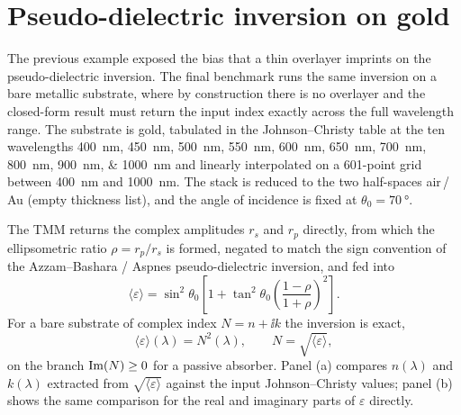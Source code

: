\section{Pseudo-dielectric inversion on gold}

The previous example exposed the bias that a thin overlayer imprints on
the pseudo-dielectric inversion. The final benchmark runs the same
inversion on a bare metallic substrate, where by construction there is
no overlayer and the closed-form result must return the input index
exactly across the full wavelength range. The substrate is gold,
tabulated in the Johnson--Christy table at the ten wavelengths
\SIlist{400;450;500;550;600;650;700;800;900;1000}{\nano\metre} and
linearly interpolated on a 601-point grid between \SI{400}{\nano\metre}
and \SI{1000}{\nano\metre}. The stack is reduced to the two
half-spaces air\,/\,Au (empty thickness list), and the angle of incidence
is fixed at $\theta_0 = \SI{70}{\degree}$.

The TMM returns the complex amplitudes $r_s$ and $r_p$ directly, from
which the ellipsometric ratio $\rho = r_p/r_s$ is formed, negated to
match the sign convention of the Azzam--Bashara / Aspnes pseudo-dielectric
inversion, and fed into
\begin{equation}
  \langle\varepsilon\rangle = \sin^{2}\theta_0\left[1 + \tan^{2}\theta_0\left(\frac{1-\rho}{1+\rho}\right)^{2}\right]. \label{eq:gold-pseudoeps}
\end{equation}
For a bare substrate of complex index $N = n + \ii k$ the inversion is
exact,
\begin{equation}
  \langle\varepsilon\rangle(\lambda) = N^{2}(\lambda),\qquad N = \sqrt{\langle\varepsilon\rangle}, \label{eq:gold-N}
\end{equation}
on the branch $\operatorname{Im}(N) \ge 0$ for a passive absorber. Panel (a) compares
$n(\lambda)$ and $k(\lambda)$ extracted from $\sqrt{\langle\varepsilon\rangle}$
against the input Johnson--Christy values; panel (b) shows the same
comparison for the real and imaginary parts of $\varepsilon$ directly.

\begin{center}
\end{center}

